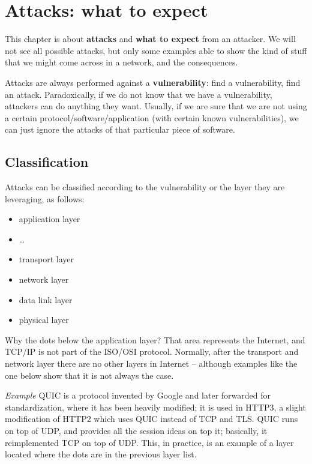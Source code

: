 \chapter{Attacks: what to expect}
\label{ch:attacks}
This chapter is about \textbf{attacks} and \textbf{what to expect} from an attacker. We will not see all possible attacks, but only some examples able to show the kind of stuff that we might come across in a network, and the consequences.

Attacks are always performed against a \textbf{vulnerability}: find a vulnerability, find an attack. Paradoxically, if we do not know that we have a vulnerability, attackers can do anything they want. Usually, if we are sure that we are not using a certain protocol/software/application (with certain known vulnerabilities), we can just ignore the attacks of that particular piece of software.
 

\section{Classification}
Attacks can be classified according to the vulnerability or the layer they are leveraging, as follows:

\begin{itemize}
	\item application layer
	\item …
	\item transport layer
	\item network layer
	\item data link layer
	\item physical layer
\end{itemize}

Why the dots below the application layer? That area represents the Internet, and TCP/IP is not part of the ISO/OSI protocol. Normally, after the transport and network layer there are no other layers in Internet – although examples like the one below show that it is not always the case.

\vspace{0.5em}

\emph{Example} QUIC is a protocol invented by Google and later forwarded for standardization, where it has been heavily modified; it is used in HTTP3, a slight modification of HTTP2 which uses QUIC instead of TCP and TLS. QUIC runs on top of UDP, and provides all the session ideas on top it; basically, it reimplemented TCP on top of UDP. This, in practice, is an example of a layer located where the dots are in the previous layer list.

